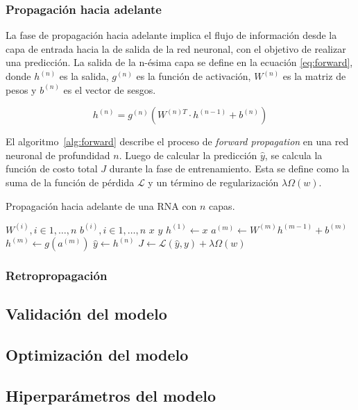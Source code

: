 \subsubsection{Propagación hacia adelante}
La fase de propagación hacia adelante implica el flujo de información desde la capa de entrada hacia la de 
salida de la red neuronal, con el objetivo de realizar una predicción. La salida de la n-ésima capa se 
define en la ecuación \ref{eq:forward}, donde $h^{(n)}$ es la salida, $g^{(n)}$ es la función de activación, $W^{(n)}$ 
es la matriz de pesos y $b^{(n)}$ es el vector de sesgos.

\begin{equation}
	\label{eq:forward}
	h^{(n)} = g^{(n)} (W^{(n)T} \cdot h^{(n-1)} + b^{(n)})
\end{equation}

El algoritmo~\ref{alg:forward} describe el proceso de \emph{forward propagation} en una red neuronal de profundidad $n$. 
Luego de calcular la predicción $\hat{y}$, se calcula la función de costo total $J$ durante la fase de entrenamiento. 
Esta se define como la suma de la función de pérdida $\mathcal{L}$ y un término de regularización $\lambda \Omega(w)$.

\begin{algorithm}
	\caption{Propagación hacia adelante de una RNA con $n$ capas.}
	\label{alg:forward}
	\begin{algorithmic}
		\Require $W^{(i)}, i \in 1, \ldots, n$ 
		\Require $b^{(i)}, i \in 1, \ldots, n$ 
		\Require $x$ 
		\Require $y$ 
		\State $h^{(1)} \gets x$
		\State $a^{(m)} \gets W^{(m)}h^{(m-1)} + b^{(m)} $
		\State $h^{(m)} \gets g(a^{(m)})$
		\EndFor
		\State $\hat{y} \gets h^{(n)}$
		\State $J \gets \mathcal{L}(\hat{y}, y) + \lambda \Omega(w)$ 
	\end{algorithmic}
\end{algorithm}

\subsubsection{Retropropagación}

\subsection{Validación del modelo}

\subsection{Optimización del modelo}

\subsection{Hiperparámetros del modelo}

